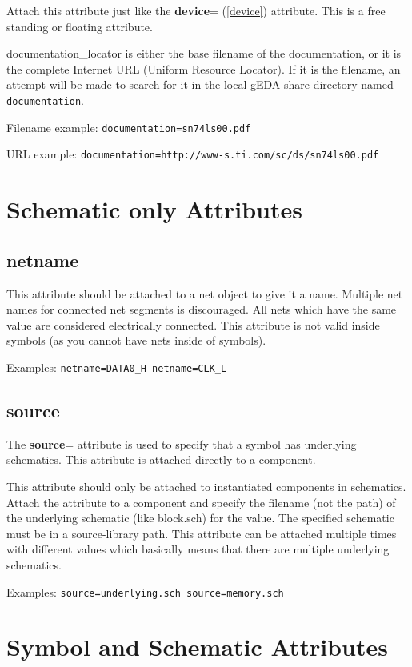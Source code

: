 \documentclass{article}
\begin{document}
Attach this attribute just like the {\bf device}= (\ref{device})
attribute.  This is a free standing or floating attribute.

documentation\_locator is either the base filename of the documentation,
or it is the complete Internet URL (Uniform Resource Locator). If it
is the filename, an attempt will be made to search for it in the local
gEDA share directory named \texttt{documentation}.

Filename example: \texttt{documentation=sn74ls00.pdf}

URL example: \texttt{documentation=http://www-s.ti.com/sc/ds/sn74ls00.pdf}


\section{Schematic only Attributes}

\subsection{{\bf netname}\label{netname}}
This attribute should be attached to a net object to give it a name.
Multiple net names for connected net segments is discouraged.  All nets
which have the same value are considered electrically connected.  This
attribute is not valid inside symbols (as you cannot have nets inside
of symbols).

Examples: \texttt{netname=DATA0\_H netname=CLK\_L}


\subsection{{\bf source}\label{source}}
The {\bf source}= attribute is used to specify that a symbol has underlying
schematics.  This attribute is attached directly to a component.

This attribute should only be attached to instantiated components
in schematics.  Attach the attribute to a component and specify the
filename (not the path) of the underlying schematic (like block.sch)
for the value.  The specified schematic must be in a source-library path.
This attribute can be attached multiple times with different values
which basically means that there are multiple underlying schematics.

Examples: \texttt{source=underlying.sch source=memory.sch}


\section{Symbol and Schematic Attributes}
\end{document}
